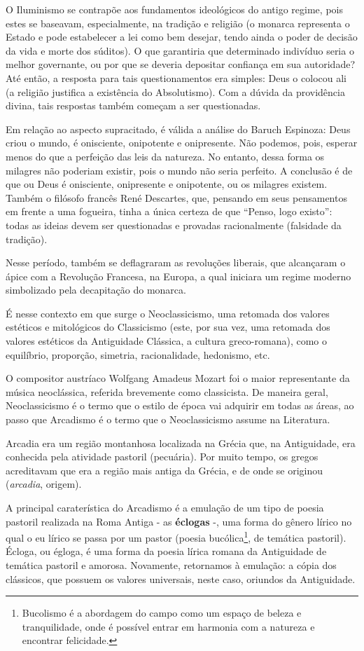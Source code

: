 O Iluminismo se contrapõe aos fundamentos ideológicos do antigo regime, pois estes se baseavam, especialmente, na tradição e religião (o monarca representa o Estado e pode estabelecer a lei como bem desejar, tendo ainda o poder de decisão da vida e morte dos súditos). O que garantiria que determinado indivíduo seria o melhor governante, ou por que se deveria depositar confiança em sua autoridade? Até então, a resposta para tais questionamentos era simples: Deus o colocou ali (a religião justifica a existência do Absolutismo). Com a dúvida da providência divina, tais respostas também começam a ser questionadas.

Em relação ao aspecto supracitado, é válida a análise do Baruch Espinoza: Deus criou o mundo, é onisciente, onipotente e onipresente. Não podemos, pois, esperar menos do que a perfeição das leis da natureza. No entanto, dessa forma os milagres não poderiam existir, pois o mundo não seria perfeito. A conclusão é de que ou Deus é onisciente, onipresente e onipotente, ou os milagres existem. Também o filósofo francês René Descartes, que, pensando em seus pensamentos em frente a uma fogueira, tinha a única certeza de que ``Penso, logo existo'': todas as ideias devem ser questionadas e provadas racionalmente (falsidade da tradição).

Nesse período, também se deflagraram as revoluções liberais, que alcançaram o ápice com a Revolução Francesa, na Europa, a qual iniciara um regime moderno simbolizado pela decapitação do monarca.

É nesse contexto em que surge o Neoclassicismo, uma retomada dos valores estéticos e mitológicos do Classicismo (este, por sua vez, uma retomada dos valores estéticos da Antiguidade Clássica, a cultura greco-romana), como o equilíbrio, proporção, simetria, racionalidade, hedonismo, etc.

O compositor austríaco Wolfgang Amadeus Mozart foi o maior representante da música neoclássica, referida brevemente como classicista. De maneira geral, Neoclassicismo é o termo que o estilo de época vai adquirir em todas as áreas, ao passo que Arcadismo é o termo que o Neoclassicismo assume na Literatura.

Arcadia era um região montanhosa localizada na Grécia que, na Antiguidade, era conhecida pela atividade pastoril (pecuária). Por muito tempo, os gregos acreditavam que era a região mais antiga da Grécia, e de onde se originou (\textit{arcadia}, origem).
		
A principal caraterística do Arcadismo é a emulação de um tipo de poesia pastoril realizada na Roma Antiga - as \textbf{éclogas} -, uma forma do gênero lírico no qual o eu lírico se passa por um pastor (poesia bucólica\footnote{Bucolismo é a abordagem do campo como um espaço de beleza e tranquilidade, onde é possível entrar em harmonia com a natureza e encontrar felicidade.}, de temática pastoril). Écloga, ou égloga, é uma forma da poesia lírica romana da Antiguidade de temática pastoril e amorosa. Novamente, retornamos à emulação: a cópia dos clássicos, que possuem os valores universais, neste caso, oriundos da Antiguidade.

